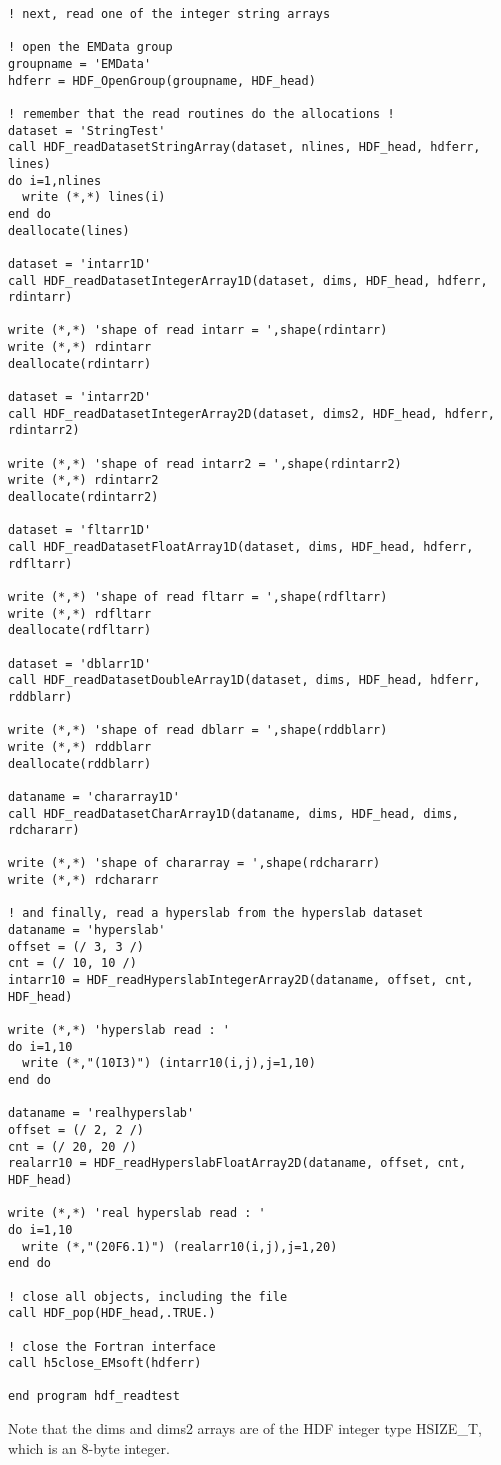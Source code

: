 \documentclass[DIV=calc, paper=letter, fontsize=11pt]{scrartcl}	 %
\begin{document}
{\begin{verbatim}
! next, read one of the integer string arrays

! open the EMData group
groupname = 'EMData'
hdferr = HDF_OpenGroup(groupname, HDF_head)

! remember that the read routines do the allocations !
dataset = 'StringTest'
call HDF_readDatasetStringArray(dataset, nlines, HDF_head, hdferr, lines)
do i=1,nlines
  write (*,*) lines(i)
end do
deallocate(lines)

dataset = 'intarr1D'
call HDF_readDatasetIntegerArray1D(dataset, dims, HDF_head, hdferr, rdintarr)

write (*,*) 'shape of read intarr = ',shape(rdintarr)
write (*,*) rdintarr
deallocate(rdintarr)

dataset = 'intarr2D'
call HDF_readDatasetIntegerArray2D(dataset, dims2, HDF_head, hdferr, rdintarr2)

write (*,*) 'shape of read intarr2 = ',shape(rdintarr2)
write (*,*) rdintarr2
deallocate(rdintarr2)

dataset = 'fltarr1D'
call HDF_readDatasetFloatArray1D(dataset, dims, HDF_head, hdferr, rdfltarr)

write (*,*) 'shape of read fltarr = ',shape(rdfltarr)
write (*,*) rdfltarr
deallocate(rdfltarr)

dataset = 'dblarr1D'
call HDF_readDatasetDoubleArray1D(dataset, dims, HDF_head, hdferr, rddblarr)

write (*,*) 'shape of read dblarr = ',shape(rddblarr)
write (*,*) rddblarr
deallocate(rddblarr)

dataname = 'chararray1D'
call HDF_readDatasetCharArray1D(dataname, dims, HDF_head, dims, rdchararr)

write (*,*) 'shape of chararray = ',shape(rdchararr)
write (*,*) rdchararr

! and finally, read a hyperslab from the hyperslab dataset
dataname = 'hyperslab'
offset = (/ 3, 3 /)
cnt = (/ 10, 10 /)
intarr10 = HDF_readHyperslabIntegerArray2D(dataname, offset, cnt, HDF_head)

write (*,*) 'hyperslab read : '
do i=1,10
  write (*,"(10I3)") (intarr10(i,j),j=1,10)
end do

dataname = 'realhyperslab'
offset = (/ 2, 2 /)
cnt = (/ 20, 20 /)
realarr10 = HDF_readHyperslabFloatArray2D(dataname, offset, cnt, HDF_head)

write (*,*) 'real hyperslab read : '
do i=1,10
  write (*,"(20F6.1)") (realarr10(i,j),j=1,20)
end do

! close all objects, including the file
call HDF_pop(HDF_head,.TRUE.)

! close the Fortran interface
call h5close_EMsoft(hdferr)

end program hdf_readtest
\end{verbatim}}
Note that the \textsf{dims} and \textsf{dims2} arrays are of the HDF integer type \textsf{HSIZE\_T}, which
is an 8-byte integer.
\end{document}
